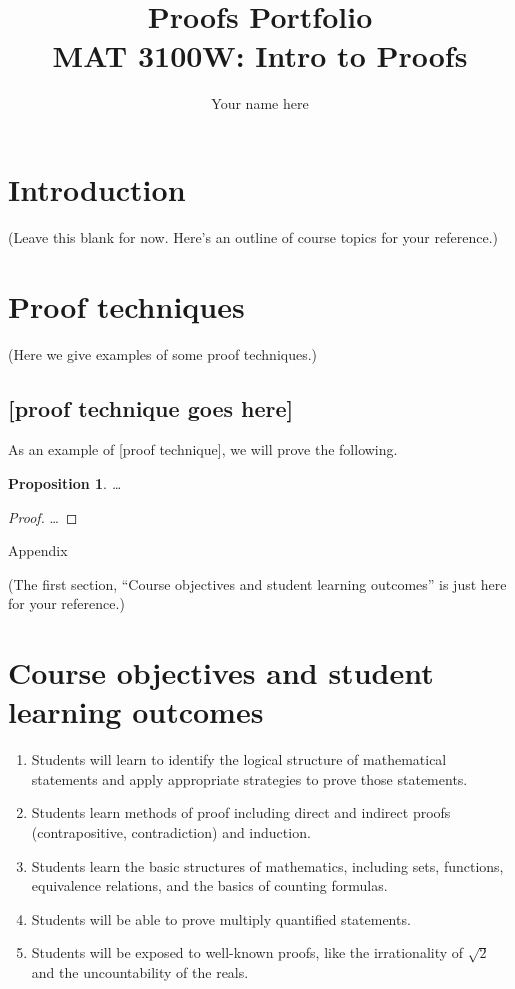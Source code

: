 \documentclass{article}
\title{Proofs Portfolio\\[5pt] \large MAT 3100W: Intro to Proofs}
\author{Your name here}
\newtheorem{proposition}{Proposition}
\theoremstyle{definition}
\begin{document}
\maketitle

\section{Introduction}
(Leave this blank for now. Here's an outline of course topics for your reference.)

\section{Proof techniques}
(Here we give examples of some proof techniques.)

\subsection{[proof technique goes here]}
As an example of [proof technique], we will prove the following.

\begin{proposition}
  \dots
\end{proposition}
\begin{proof}
  \dots
\end{proof}

\pagebreak
\appendix
\begin{center}
    \LARGE Appendix
\end{center}
\noindent (The first section, ``Course objectives and student learning outcomes'' is just here for your reference.)
\section{Course objectives and student learning outcomes}

\begin{enumerate}
    \item Students will learn to identify the logical structure of mathematical statements and apply appropriate strategies to prove those statements.
    \item Students learn methods of proof including direct and indirect proofs (contrapositive, contradiction) and induction.
    \item Students learn the basic structures of mathematics, including sets, functions, equivalence relations, and the basics of counting formulas.
    \item Students will be able to prove multiply quantified statements.
    \item Students will be exposed to well-known proofs, like the irrationality of $\sqrt{2}$ and the uncountability of the reals.
\end{enumerate}
\end{document}
